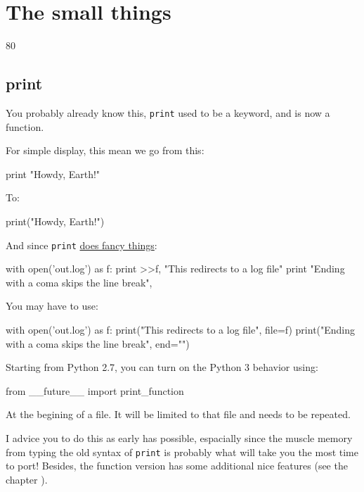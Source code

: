
\chapter{The small things}

80%

\section{print}

You probably already know this, \lstinline{print} used to be a keyword, and is now a function.

For simple display, this mean we go from this:

\begin{py}
print "Howdy, Earth!"
\end{py}


To:

\begin{py}
print("Howdy, Earth!")
\end{py}

And since \lstinline{print} \href{https://www.python.org/dev/peps/pep-0214/}{does fancy things}:

\begin{py}
with open('out.log') as f:
    print >>f, "This redirects to a log file"
print "Ending with a coma skips the line break",
\end{py}

You may have to use:

\begin{py}
with open('out.log') as f:
    print("This redirects to a log file", file=f)
print("Ending with a coma skips the line break", end="")
\end{py}

Starting from Python 2.7, you can turn on the Python 3 behavior using:

\begin{py}
from __future__ import print_function
\end{py}

At the begining of a file. It will be limited to that file and needs to be repeated.

I advice you to do this as early has possible, espacially since the muscle memory from typing the old syntax of \lstinline{print} is probably what will take you the most time to port! Besides, the function version has some additional nice features (see the chapter ).

